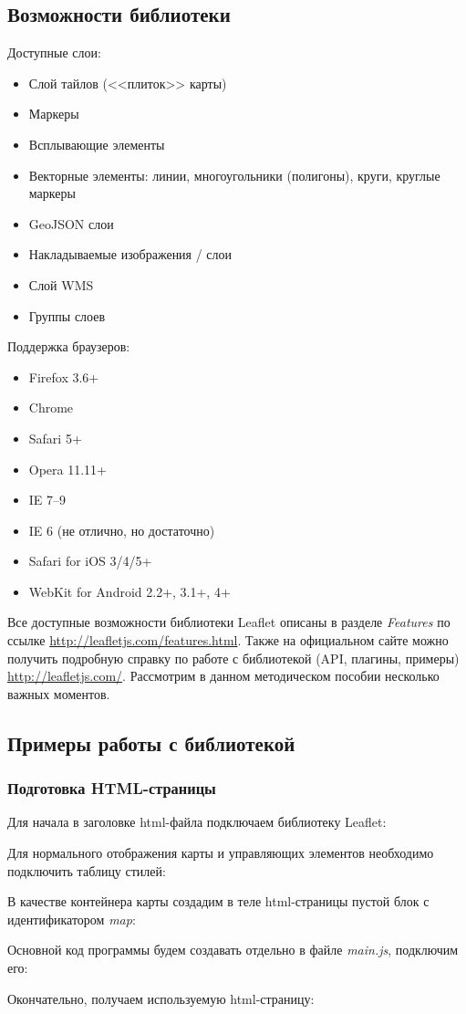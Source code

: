 \subsection{Возможности библиотеки}
Доступные слои:
\begin{itemize}
    \item Слой тайлов (<<плиток>> карты)
    \item Маркеры
    \item Всплывающие элементы
    \item Векторные элементы: линии, многоугольники (полигоны), круги,
        круглые маркеры
    \item GeoJSON слои
    \item Накладываемые изображения / слои
    \item Слой WMS
    \item Группы слоев
\end{itemize}

Поддержка браузеров:
\begin{itemize}
    \item Firefox 3.6+
    \item Chrome
    \item Safari 5+
    \item Opera 11.11+
    \item IE 7–9
    \item IE 6 (не отлично, но достаточно)
    \item Safari for iOS 3/4/5+
    \item WebKit for Android 2.2+, 3.1+, 4+
\end{itemize}

Все доступные возможности библиотеки Leaflet описаны в разделе 
\emph{Features} по ссылке \url{http://leafletjs.com/features.html}. 
Также на официальном сайте можно получить подробную справку по 
работе с библиотекой (API, плагины, примеры) \url{http://leafletjs.com/}. 
Рассмотрим в данном методическом пособии несколько важных моментов.

\subsection{Примеры работы с библиотекой}
\subsubsection{Подготовка HTML-страницы}
Для начала в заголовке html-файла подключаем библиотеку Leaflet:

Для нормального отображения карты и управляющих элементов необходимо 
подключить таблицу стилей:

В качестве контейнера карты создадим в теле html-страницы пустой блок с 
идентификатором \emph{map}:

Основной код программы будем создавать отдельно в файле \emph{main.js}, 
подключим его:

Окончательно, получаем используемую html-страницу:


